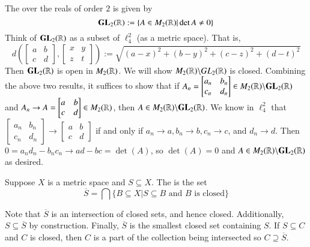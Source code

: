 \begin{eg}
    The  over the reals of order $2$ is given by $$\mathbf{GL}_2(\mathbb R) := \{A \in M_2(\mathbb R)\vert \det A \neq 0\}$$ Think of $\mathbf{GL}_2(\mathbb R)$ as a subset of $\ell_4^2$ (as a metric space). That is, $$d\left(\begin{bmatrix} a & b \\ c & d\end{bmatrix},\begin{bmatrix} x & y \\ z & t\end{bmatrix}\right) := \sqrt{(a-x)^2+(b-y)^2 + (c-z)^2 + (d-t)^2}$$ Then $\mathbf{GL}_2(\mathbb R)$ is open in $M_2(\mathbb R)$. We will show $M_2(\mathbb R)\backslash GL_2(\mathbb R)$ is closed. Combining the above two results, it suffices to show that if $A_n = \begin{bmatrix} a_n & b_n \\ c_n & d_n\end{bmatrix} \in M_2(\mathbb R) \backslash\mathbf{GL}_2(\mathbb R)$ and $A_n \rightarrow A = \begin{bmatrix} a & b \\ c & d\end{bmatrix} \in M_2(\mathbb R)$, then $A \in M_2(\mathbb R)\backslash\mathbf{GL}_2(\mathbb R)$. We know in $\ell_4^2$ that $\begin{bmatrix} a_n & b_n \\ c_n & d_n\end{bmatrix}\rightarrow \begin{bmatrix} a & b \\ c & d\end{bmatrix}$ if and only if $a_n\rightarrow a,b_n\rightarrow b, c_n\rightarrow c$, and $d_n\rightarrow d$. Then $0 = a_nd_n - b_nc_n\rightarrow ad-bc = \det(A)$, so $\det(A) = 0$ and $A \in M_2(\mathbb R)\backslash\mathbf{GL}_2(\mathbb R)$ as desired.
\end{eg}

\begin{defn}[Closures]
    Suppose $X$ is a metric space and $S \subseteq X$. The  is the set $$\overline{S} = \bigcap\{B\subseteq X\vert S\subseteq B\text{ and $B$ is closed}\}$$
\end{defn}

Note that $\overline{S}$ is an intersection of closed sets, and hence closed. Additionally, $S \subseteq \overline{S}$ by construction. Finally, $\overline{S}$ is the smallest closed set containing $S$. If $S \subseteq C$ and $C$ is closed, then $C$ is a part of the collection being intersected so $C \supseteq \overline{S}$.

